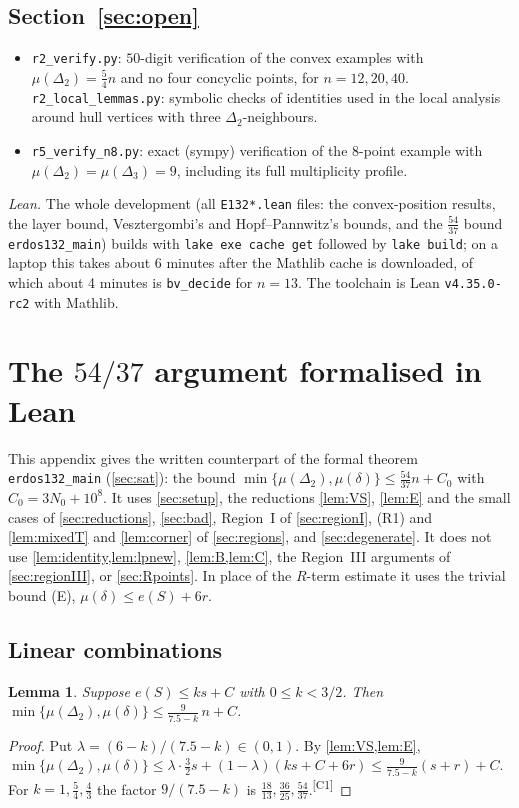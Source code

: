 \documentclass[11pt]{amsart}
\newtheorem{lemma}[theorem]{Lemma}
\theoremstyle{definition}
\theoremstyle{remark}
\newcommand{\Dt}{\Delta_2}
\newcommand{\mult}{\mu}
\newcommand{\chk}[1]{\textsuperscript{[#1]}}
\begin{document}
\subsection*{\texorpdfstring{Section~\ref{sec:open}}{Open problems}}
\begin{itemize}[leftmargin=2em]
\item \texttt{r2\_verify.py}: $50$-digit verification of the convex examples with $\mult(\Dt)=\frac54n$ and no four concyclic points, for $n=12,20,40$. \texttt{r2\_local\_lemmas.py}: symbolic checks of identities used in the local analysis around hull vertices with three $\Dt$-neighbours.
\item \texttt{r5\_verify\_n8.py}: exact (sympy) verification of the $8$-point example with $\mult(\Dt)=\mult(\Delta_3)=9$, including its full multiplicity profile.
\end{itemize}

\emph{Lean.} The whole development (all \texttt{E132*.lean} files: the convex-position results, the layer bound, Vesztergombi's and Hopf--Pannwitz's bounds, and the $\frac{54}{37}$ bound \texttt{erdos132\_main}) builds with \texttt{lake exe cache get} followed by \texttt{lake build}; on a laptop this takes about 6 minutes after the Mathlib cache is downloaded, of which about 4 minutes is \texttt{bv\_decide} for $n=13$. The toolchain is Lean \texttt{v4.35.0-rc2} with Mathlib.

\section{The \texorpdfstring{$54/37$}{54/37} argument formalised in Lean}\label{app:lean54}

This appendix gives the written counterpart of the formal theorem \texttt{erdos132\_main} (\cref{sec:sat}): the bound $\min\{\mult(\Dt),\mult(\delta)\}\le\frac{54}{37}n+C_0$ with $C_0=3N_0+10^8$. It uses \cref{sec:setup}, the reductions \cref{lem:VS}, \cref{lem:E} and the small cases of \cref{sec:reductions}, \cref{sec:bad}, Region~I of \cref{sec:regionI}, (R1) and \cref{lem:mixedT} and \cref{lem:corner} of \cref{sec:regions}, and \cref{sec:degenerate}. It does not use \cref{lem:identity,lem:lpnew}, \cref{lem:B,lem:C}, the Region~III arguments of \cref{sec:regionIII}, or \cref{sec:Rpoints}. In place of the $R$-term estimate it uses the trivial bound (E), $\mult(\delta)\le e(S)+6r$.

\subsection*{Linear combinations}
\begin{lemma}\label{lem:lp}
Suppose $e(S)\le k s+C$ with $0\le k<3/2$. Then $\min\{\mult(\Dt),\mult(\delta)\}\le \frac{9}{7.5-k}\,n+C$.
\end{lemma}
\begin{proof}
Put $\lambda=(6-k)/(7.5-k)\in(0,1)$. By \cref{lem:VS,lem:E},
$\min\{\mult(\Dt),\mult(\delta)\}\le\lambda\cdot\tfrac32 s+(1-\lambda)(ks+C+6r)\le \tfrac{9}{7.5-k}(s+r)+C$.
For $k=1,\frac54,\frac43$ the factor $9/(7.5-k)$ is $\frac{18}{13},\frac{36}{25},\frac{54}{37}$.\chk{C1}
\end{proof}
\end{document}
